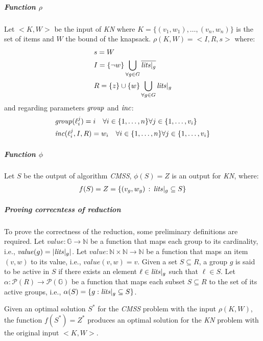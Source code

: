 \subparagraph{Function $\rho$} 
Let $<K,W>$ be the input of \textit{KN} where $K=\{(v_1,w_1),\hdots,(v_n,w_n)\}$ is the set of items and 
$W$ the bound of the knapsack.
$\rho(K,W) = <I,R,s>$
where: 
\begin{align*}
    &s = W \\
    &I = \{\neg w\} \bigcup_{\forall g \in G} \overline{\mathit{lits}|_g} \\
    &R = \{z\} \cup \{w\} \bigcup_{\forall g \in G} \mathit{lits}|_g\\
\end{align*}
and regarding parameters $\mathit{group}$ and $\mathit{inc}$:
\begin{align*}
    & \mathit{group}(\ell_i^j) = i \quad \forall i \in \{1, \hdots, n\} \forall j \in \{ 1, \hdots, v_i \} \\
    & \mathit{inc}(\ell_i^j, I, R) = w_i \quad \forall i \in \{1, \hdots, n\} \forall j \in \{ 1, \hdots, v_i \} \\    
\end{align*}

\subparagraph{Function $\phi$} 
Let $S$ be the output of algorithm \textit{CMSS}, $\phi(S) = Z$ is an output for \textit{KN},
where:
\begin{align*}
    f(S) =  Z  = \{(v_g, w_g) \,:\, \mathit{lits}|_g \subseteq S\}\\
\end{align*}

\subparagraph{Proving correcntess of reduction}

To prove the correctness of the reduction, some preliminary definitions are required.
Let $\mathit{value}: \mathbb{G} \to \mathbb{N}$ be a function that maps each group to 
its cardinality, i.e., $\mathit{value}(g) = |\mathit{lits}|_g|$.
Let $\mathit{value}: \mathbb{N} \times \mathbb{N} \to \mathbb{N}$ be a function that 
maps an item $(v, w)$ to its value, i.e., $\mathit{value}(v, w) = v$.
Given a set $S \subseteq R$, a group $g$ is said to be active in $S$ if there exists 
an element $\ell \in \mathit{lits}|_g$ such that $\ell \in S$.
Let $\alpha: \mathcal{P}(R) \to \mathcal{P}(\mathbb{G})$ be a function that maps 
each subset $S \subseteq R$ to the set of its active groups, i.e., 
$\alpha(S) = \{ g : \mathit{lits}|_g \subseteq S \}$.


\begin{theorem}
    Given an optimal solution \( S^* \) for the \textit{CMSS} problem with the input $\rho(K,W)$, 
    the function \( f(S^*) = Z^* \) produces an optimal solution for the \textit{KN}
    problem with the original input \( <K,W> \).
\end{theorem}

